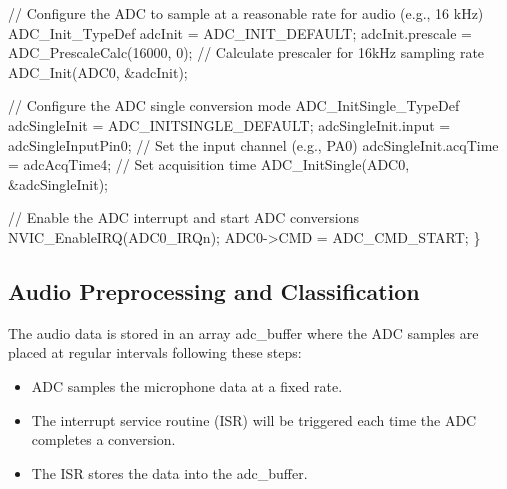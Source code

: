 \documentclass[
  9pt,
  letterpaper,
  abstract,
  titlepage]{scrbook}
\newenvironment{Shaded}{\begin{snugshade}}{\end{snugshade}}
\newcommand{\CommentTok}[1]{\textcolor[rgb]{0.37,0.37,0.37}{#1}}
\newcommand{\DecValTok}[1]{\textcolor[rgb]{0.68,0.00,0.00}{#1}}
\newcommand{\NormalTok}[1]{\textcolor[rgb]{0.00,0.23,0.31}{#1}}
\newcommand{\OperatorTok}[1]{\textcolor[rgb]{0.37,0.37,0.37}{#1}}
\begin{document}
\begin{Shaded}
\begin{Highlighting}[]
    \CommentTok{// Configure the ADC to sample at a reasonable rate for audio (e.g., 16 kHz)}
\NormalTok{    ADC\_Init\_TypeDef adcInit }\OperatorTok{=}\NormalTok{ ADC\_INIT\_DEFAULT}\OperatorTok{;}
\NormalTok{    adcInit}\OperatorTok{.}\NormalTok{prescale }\OperatorTok{=}\NormalTok{ ADC\_PrescaleCalc}\OperatorTok{(}\DecValTok{16000}\OperatorTok{,} \DecValTok{0}\OperatorTok{);}  \CommentTok{// Calculate prescaler for 16kHz sampling rate}
\NormalTok{    ADC\_Init}\OperatorTok{(}\NormalTok{ADC0}\OperatorTok{,} \OperatorTok{\&}\NormalTok{adcInit}\OperatorTok{);}

    \CommentTok{// Configure the ADC single conversion mode}
\NormalTok{    ADC\_InitSingle\_TypeDef adcSingleInit }\OperatorTok{=}\NormalTok{ ADC\_INITSINGLE\_DEFAULT}\OperatorTok{;}
\NormalTok{    adcSingleInit}\OperatorTok{.}\NormalTok{input }\OperatorTok{=}\NormalTok{ adcSingleInputPin0}\OperatorTok{;}  \CommentTok{// Set the input channel (e.g., PA0)}
\NormalTok{    adcSingleInit}\OperatorTok{.}\NormalTok{acqTime }\OperatorTok{=}\NormalTok{ adcAcqTime4}\OperatorTok{;}       \CommentTok{// Set acquisition time}
\NormalTok{    ADC\_InitSingle}\OperatorTok{(}\NormalTok{ADC0}\OperatorTok{,} \OperatorTok{\&}\NormalTok{adcSingleInit}\OperatorTok{);}

    \CommentTok{// Enable the ADC interrupt and start ADC conversions}
\NormalTok{    NVIC\_EnableIRQ}\OperatorTok{(}\NormalTok{ADC0\_IRQn}\OperatorTok{);}
\NormalTok{    ADC0}\OperatorTok{{-}\textgreater{}}\NormalTok{CMD }\OperatorTok{=}\NormalTok{ ADC\_CMD\_START}\OperatorTok{;}
\OperatorTok{\}}
\end{Highlighting}
\end{Shaded}

\subsection{Audio Preprocessing and
Classification}\label{audio-preprocessing-and-classification}

The audio data is stored in an array adc\_buffer where the ADC samples
are placed at regular intervals following these steps:

\begin{itemize}
\item
  ADC samples the microphone data at a fixed rate.
\item
  The interrupt service routine (ISR) will be triggered each time the
  ADC completes a conversion.
\item
  The ISR stores the data into the adc\_buffer.
\end{itemize}
\end{document}
